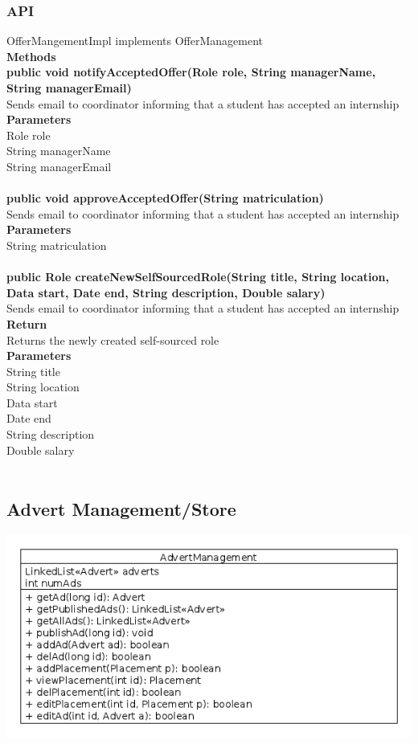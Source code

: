 \documentclass{l3deliverable}
\begin{document}
\subsubsection{API}
OfferMangementImpl implements OfferManagement\\
\textbf{Methods}\\

\textbf{public void notifyAcceptedOffer(Role role, String managerName, String managerEmail)}\\
Sends email to coordinator informing that a student has accepted an internship\\
\textbf{Parameters}\\
Role role\\
String managerName\\
String managerEmail\\
\\

\textbf{public void approveAcceptedOffer(String matriculation)}\\
Sends email to coordinator informing that a student has accepted an internship\\
\textbf{Parameters}\\
String matriculation\\
\\
\textbf{public Role createNewSelfSourcedRole(String title, String location, Data start, Date end, String description, Double salary)}\\
Sends email to coordinator informing that a student has accepted an internship\\
\textbf{Return}\\
Returns the newly created self-sourced role\\
\textbf{Parameters}\\
String title\\
String location\\
Data start\\
Date end\\
String description\\
Double salary\\
\\

\subsection{Advert Management/Store}
\includegraphics[scale = 0.5]{adStore.png}
\end{document}
